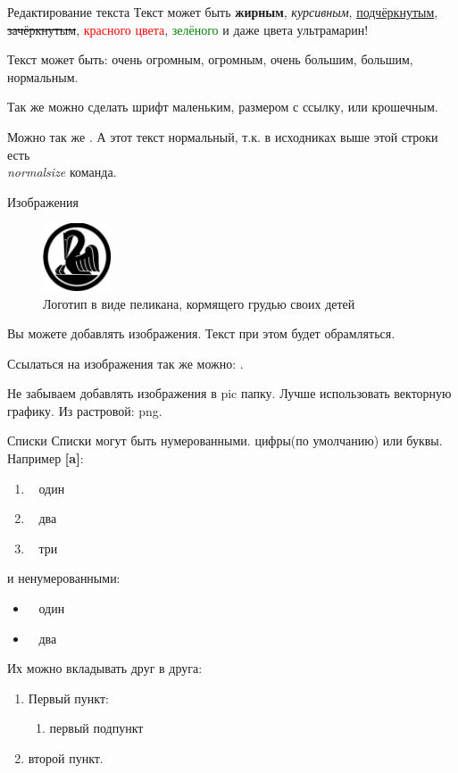 \begin{frame}{Редактирование текста}
	Текст может быть 
	\textbf{жирным}, 
	\textit{курсивным},
	\underline{подчёркнутым},
	\sout{зачёркнутым},
	\textcolor{red}{красного цвета}, \textcolor{green}{зелёного} 	
	и даже \textcolor[RGB]{18,10,143}{цвета ультрамарин}! 
	
	Текст может быть:
	\Huge очень огромным,
	\huge огромным,
	\Large очень большим,
	\large большим,
	\normalsize нормальным.
	
	Так же можно сделать шрифт
	\small маленьким,
	\footnotesize размером с ссылку,
	\tiny или крошечным.
	
	Можно так же .
	\normalsize
	А этот текст нормальный, т.к. в исходниках выше этой строки есть \textit{\\normalsize} команда.
\end{frame}

\begin{frame}{Изображения}
	\begin{figure}
		\includegraphics[width=2cm]{../pic/kib_old_logo.png}
		\caption{Логотип в виде пеликана, кормящего грудью своих детей}
		\label{figure:pelican_1}
	\end{figure}
	Вы можете добавлять изображения.
	Текст при этом будет обрамляться.
	
	Ссылаться на изображения так же можно: .
	
	Не забываем добавлять изображения в pic папку.
	Лучше использовать векторную графику. 
	Из растровой: png.
\end{frame}

\begin{frame}{Списки}
	Списки могут быть нумерованными. цифры(по умолчанию) или буквы. Например \textbf{[a]}:
	\begin{enumerate}[a]
		\item~ один
		\item~ два
		\item~ три
	\end{enumerate}
	и ненумерованными:
	\begin{itemize}
		\item~ один
		\item~ два
	\end{itemize}
	Их можно вкладывать друг в друга:
	\begin{enumerate}
		\item Первый пункт:
		\begin{enumerate}
			\item первый подпункт
		\end{enumerate}
		\item второй пункт.
	\end{enumerate}
\end{frame}

